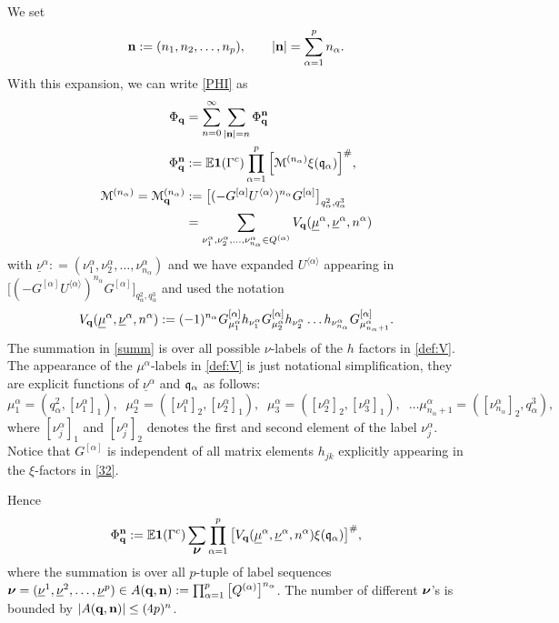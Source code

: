 \documentclass[draft]{article}
\newcommand{\non}{\nonumber}
\newcommand{\unu}{{\underline {\nu}}}
\newcommand{\umu}{{\underline {\mu}}}
\newcommand{\bq}{{\bf {q}}}
\newcommand{\bn}{{\bf{n}}}
\newcommand{\fq}{{\frak q}}
\newcommand{\sa}{{[\alpha ]}}
\newcommand{\bnu}{\mbox{\boldmath $\nu$}}
\newcommand{\al}{\alpha}
\newcommand{\be}{\begin{equation}}
\newcommand{\ee}{\end{equation}}
\newcommand{\cM}{{\mathcal M}}
\newcommand{\E}{{\mathbb E }}
\numberwithin{equation}{section}
\numberwithin{theorem}{section}
\numberwithin{definition}{section}
\numberwithin{remark}{section}
\begin{document}
We set 
$$
  {\bf n} := (n_1, n_2, \ldots , n_p), \qquad |{\bf n} | = \sum_{\alpha=1}^p  n_\alpha.
$$
With this expansion, we can write \eqref{PHI} as
\begin{align}\label{32}
 \Phi_{\bq } & = \sum_{n=0}^\infty \sum_{ |{\bf n} | =n}  \Phi_{\bq}^{\bf n} \quad
\non\\
 \Phi_{\bq}^{\bf n} & : =  \E {\bf 1} (\Gamma^c)   \prod_{\alpha=1}^{p} 
 \Big[ \cM^{(n_\alpha)}  \xi (\fq_\al)\Big]^\#
 ,  \\
  \cM^{(n_\alpha)}= \cM_{\bq }^{(n_\alpha)} & :=   
 \big [  (-G^{\sa } U^{\langle \alpha \rangle } )^{n_\alpha}G^{\sa }  
  \big ]_{q^2_\alpha, q^3_\alpha}   \\
  & =  \sum_{ \nu^\alpha_1, \nu^\al_2, \ldots , \nu^\al_{n_\al} \in  Q^{(\alpha)}}
  V_{\bq}( \underline{\mu}^\alpha, \underline{\nu}^\alpha, n^\al )\label{summ}
\end{align}
with $\unu^\al: = ( \nu^\alpha_1, \nu^\al_2, \ldots , \nu^\al_{n_\al})$ and 
we have expanded  $U^{\langle \alpha \rangle }$ appearing in   
$\big [   (-G^{\sa } U^{\langle \alpha \rangle } )^{n_\alpha}G^{\sa } \big ]_{q^2_\alpha, q^3_\alpha}$
 and used the notation 
\be\label{def:V}
  V_{\bq}( \underline{\mu}^\alpha, \underline{\nu}^\alpha, n^\al): =  (-1)^{n_\al}
 G^{\sa }_{\mu^\alpha_1} h_{\nu^\alpha_1}
 G^{\sa }_{\mu^\alpha_2}h_{\nu^\alpha_2} \ldots 
 h_{\nu^\alpha_{n_\al}} G^{\sa }_{\mu^\alpha_{n_\alpha+1}}. 
\ee
The summation in \eqref{summ} is over all possible $\nu$-labels 
of the $h$ factors 
in \eqref{def:V}. The appearance of the $\mu^\al$-labels in
 \eqref{def:V} is just
 notational simplification,
they are explicit functions of $\underline{\nu}^\al$ and $\fq_\al$ as follows:
\be\label{121}
    \mu^\alpha_1 = (q^2_\alpha,  [\nu^\al_1]_1 ), \;\; 
  \mu^\al_2 = ( [\nu^\al_1]_2 , [\nu^\al_2]_1), \;\;
 \mu^\al_3 = ( [\nu^\al_2]_2 , [\nu^\al_3]_1), \;\; \ldots
  \mu^\al_{n_\al+1} = ( [\nu^\al_{n_\al}]_2 , q^3_\alpha ),
\ee
where $[\nu^\al_j]_1$ and  $[\nu^\al_j]_2$ denotes the first and second
element of the label $\nu^\al_j$.
Notice that  $G^{\sa } $ is independent of all matrix 
elements $h_{jk}$ explicitly appearing in the $\xi$-factors in \eqref{32}. 


Hence
\begin{align}\label{213}
 \Phi_{\bq}^{\bf n}  :=    \E {\bf 1} (\Gamma^c)   \sum_{ \bnu}  
  \prod_{\alpha=1}^{p} \big[  V_\bq( \umu^\alpha, \unu^\alpha, n^\al)   \xi (\fq_\al)\big]^\#,
\end{align}
where the summation is over all $p$-tuple of label sequences 
 $\bnu= (\underline{\nu}^1, \underline{\nu}^2, \ldots , \underline{\nu}^p)
  \in A(\bq, \bn):=\prod_{\al=1}^p \big[Q^{(\al)}\big]^{n_\al}$.
The number of different $\bnu$'s is bounded by $|A(\bq,\bn)|\le(4p)^n$.
\end{document}
